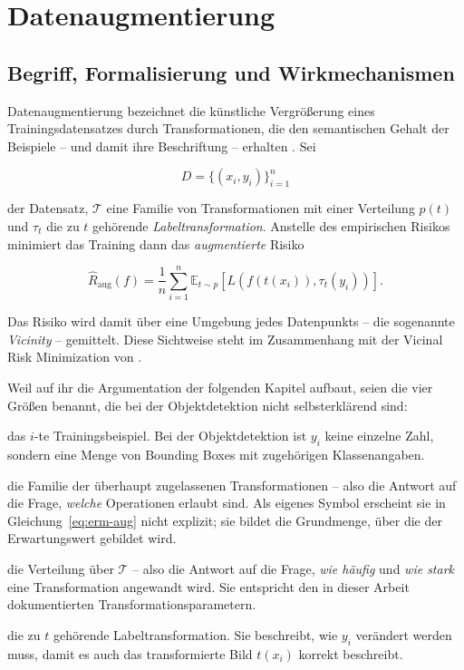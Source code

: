 \chapter{Datenaugmentierung}
\label{kap:augtheorie}

\section{Begriff, Formalisierung und Wirkmechanismen}
\label{sec:augformal}

Datenaugmentierung bezeichnet die künstliche Vergrößerung eines Trainingsdatensatzes durch Transformationen, die den semantischen Gehalt der Beispiele -- und damit ihre Beschriftung -- erhalten \parencite{shorten2019}. Sei

\[
D = \{(x_i,y_i)\}_{i=1}^{n}
\]

der Datensatz, $\mathcal{T}$ eine Familie von Transformationen mit einer Verteilung $p(t)$ und $\tau_t$ die zu $t$ gehörende \emph{Labeltransformation}. Anstelle des empirischen Risikos minimiert das Training dann das \emph{augmentierte} Risiko

\begin{equation}
\hat{R}_{\mathrm{aug}}(f)
=
\frac{1}{n}
\sum_{i=1}^{n}
\mathbb{E}_{t\sim p}
\left[
L\left(f(t(x_i)),\tau_t(y_i)\right)
\right].
\label{eq:erm-aug}
\end{equation}

Das Risiko wird damit über eine Umgebung jedes Datenpunkts -- die sogenannte \emph{Vicinity} -- gemittelt. Diese Sichtweise steht im Zusammenhang mit der Vicinal Risk Minimization von \textcite{chapelle2001}.

Weil auf ihr die Argumentation der folgenden Kapitel aufbaut, seien die vier Größen benannt, die bei der Objektdetektion nicht selbsterklärend sind:

\begin{description}[
leftmargin=4.2em,
style=sameline,
itemsep=0pt,
font=\normalfont
]
\item[$(x_i,y_i)$]
das $i$-te Trainingsbeispiel. Bei der Objektdetektion ist $y_i$ keine einzelne Zahl, sondern eine Menge von Bounding Boxes mit zugehörigen Klassenangaben.

\item[$\mathcal{T}$]
die Familie der überhaupt zugelassenen Transformationen -- also die Antwort auf die Frage, \emph{welche} Operationen erlaubt sind. Als eigenes Symbol erscheint sie in Gleichung~\eqref{eq:erm-aug} nicht explizit; sie bildet die Grundmenge, über die der Erwartungswert gebildet wird.

\item[$p(t)$]
die Verteilung über $\mathcal{T}$ -- also die Antwort auf die Frage, \emph{wie häufig} und \emph{wie stark} eine Transformation angewandt wird. Sie entspricht den in dieser Arbeit dokumentierten Transformationsparametern.

\item[$\tau_t$]
die zu $t$ gehörende Labeltransformation. Sie beschreibt, wie $y_i$ verändert werden muss, damit es auch das transformierte Bild $t(x_i)$ korrekt beschreibt.
\end{description}

